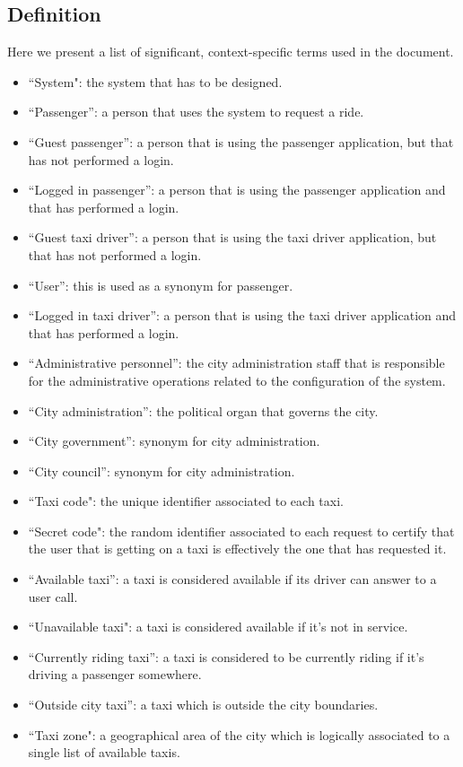 \subsection{Definition}
Here we present a list of significant, context-specific terms used in the document.
\begin{itemize}
\item “System": the system that has to be designed. 
\item “Passenger”: a person that uses the system to request a ride.
\item “Guest passenger”: a person that is using the passenger application, but that has not performed a login. 
\item “Logged in passenger”: a person that is using the passenger application and that has performed a login. 
\item “Guest taxi driver”: a person that is using the taxi driver application, but that has not performed a login. 
\item “User”: this is used as a synonym for passenger.
\item “Logged in taxi driver”: a person that is using the taxi driver application and that has performed a login. 
\item “Administrative personnel”: the city administration staff that is responsible for the administrative operations related to the configuration of the system.
\item “City administration”: the political organ that governs the city.
\item “City government”: synonym for city administration.
\item “City council”:  synonym for city administration.
\item “Taxi code": the unique identifier associated to each taxi.
\item “Secret code": the random identifier associated to each request to certify that the user that is getting on a taxi is effectively the one that has requested it.
\item “Available taxi”: a taxi is considered available if its driver can answer to a user call.
\item “Unavailable taxi":  a taxi is considered available if it’s not in service.
\item “Currently riding taxi”: a taxi is considered to be currently riding if it’s driving a passenger somewhere. 
\item “Outside city taxi”: a taxi which is outside the city boundaries. 
\item “Taxi zone": a geographical area of the city which is logically associated to a single list of available taxis. 

\end{itemize}
